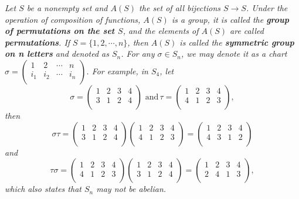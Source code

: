 \begin{example}\em
Let $S$ be a nonempty set and $A(S)$ the set of all bijections $S\to S$. Under the operation of composition of functions, $A(S)$ is a group, it is called the \textbf{group of permutations on the set $S$}, and the elements of $A(S)$ are called \textbf{permutations}. If $S=\{1,2,\cdots,n\}$, then $A(S)$ is called the \textbf{symmetric group on n letters} and denoted as $S_n$. For any $\sigma\in S_n$, we may denote it as a chart $\sigma =\left( \begin{matrix}
	1&		2&		\cdots&		n\\
	i_1&		i_2&		\cdots&		i_n\\
\end{matrix} \right) $. For example, in $S_4$, let 
$$
\sigma =\left( \begin{matrix}
	1&		2&		3&		4\\
	3&		1&		2&		4\\
\end{matrix} \right) \,\,\text{and}\, \tau =\left( \begin{matrix}
	1&		2&		3&		4\\
	4&		1&		2&		3\\
\end{matrix} \right) ,
$$
then 
$$
\sigma \tau =\left( \begin{matrix}
	1&		2&		3&		4\\
	3&		1&		2&		4\\
\end{matrix} \right) \left( \begin{matrix}
	1&		2&		3&		4\\
	4&		1&		2&		3\\
\end{matrix} \right) =\left( \begin{matrix}
	1&		2&		3&		4\\
	4&		3&		1&		2\\
\end{matrix} \right) 
$$
and
$$
\tau \sigma =\left( \begin{matrix}
	1&		2&		3&		4\\
	4&		1&		2&		3\\
\end{matrix} \right) \left( \begin{matrix}
	1&		2&		3&		4\\
	3&		1&		2&		4\\
\end{matrix} \right) =\left( \begin{matrix}
	1&		2&		3&		4\\
	2&		4&		1&		3\\
\end{matrix} \right) ,
$$
which also states that $S_n$ may not be abelian.
\end{example}
